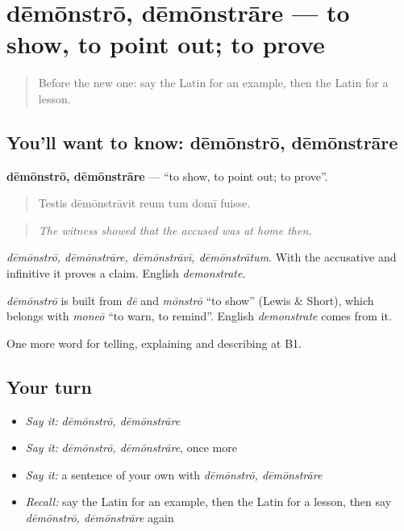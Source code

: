\section[dēmōnstrō, dēmōnstrāre]{dēmōnstrō, dēmōnstrāre — to show, to point out; to prove}

\label{lesson:LA-C361-demonstro}



\begin{quote}
Before the new one: say the Latin for an example, then the Latin for a lesson.
\end{quote}

\subsection*{You'll want to know: dēmōnstrō, dēmōnstrāre}
\textbf{dēmōnstrō, dēmōnstrāre} — \textquotedblleft{}to show, to point out; to prove\textquotedblright{}.

\begin{quote}
Testis dēmōnstrāvit reum tum domī fuisse.
\end{quote}

\begin{quote}
\emph{The witness showed that the accused was at home then.}
\end{quote}

\emph{dēmōnstrō, dēmōnstrāre, dēmōnstrāvī, dēmōnstrātum}. With the accusative and infinitive it proves a claim. English \emph{demonstrate}.

\begin{cousinweb}
\emph{dēmōnstrō} is built from \emph{dē} and \emph{mōnstrō} \textquotedblleft{}to show\textquotedblright{} (Lewis \& Short), which belongs with \emph{moneō} \textquotedblleft{}to warn, to remind\textquotedblright{}. English \emph{demonstrate} comes from it.
\end{cousinweb}

\begin{grammarlens}[title={What you've built}]
One more word for telling, explaining and describing at B1.
\end{grammarlens}

\subsection*{Your turn}
\begin{itemize}
\raggedright
  \item \emph{Say it:} \emph{dēmōnstrō, dēmōnstrāre}
  \item \emph{Say it:} \emph{dēmōnstrō, dēmōnstrāre}, once more
  \item \emph{Say it:} a sentence of your own with \emph{dēmōnstrō, dēmōnstrāre}
  \item \emph{Recall:} say the Latin for an example, then the Latin for a lesson, then say \emph{dēmōnstrō, dēmōnstrāre} again
\end{itemize}

